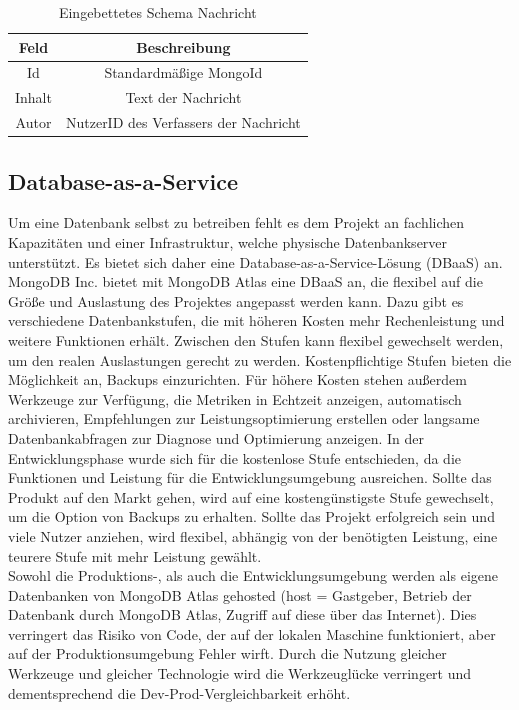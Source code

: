 \begin{table}
    \centering
    \begin{tabular}{ |c|c| }
        \hline
        Feld & Beschreibung  \\
        \hline
        Id & Standardmäßige MongoId \\
        Inhalt & Text der Nachricht \\
        Autor & NutzerID des Verfassers der Nachricht \\
        \hline
    \end{tabular}
    \caption{Eingebettetes Schema Nachricht}
    \label{db:table:nachricht}
\end{table}

\subsection{Database-as-a-Service}
Um eine Datenbank selbst zu betreiben fehlt es dem Projekt an fachlichen Kapazitäten und einer Infrastruktur, welche physische Datenbankserver unterstützt.
Es bietet sich daher eine Database-as-a-Service-Lösung (DBaaS) an.\\ 
MongoDB Inc. bietet mit MongoDB Atlas eine DBaaS an, die flexibel auf die Größe und Auslastung des Projektes angepasst werden kann.
Dazu gibt es verschiedene Datenbankstufen, die mit höheren Kosten mehr Rechenleistung und weitere Funktionen erhält.
Zwischen den Stufen kann flexibel gewechselt werden, um den realen Auslastungen gerecht zu werden.
Kostenpflichtige Stufen bieten die Möglichkeit an, Backups einzurichten.
Für höhere Kosten stehen außerdem Werkzeuge zur Verfügung, die Metriken in Echtzeit anzeigen, automatisch archivieren, Empfehlungen zur Leistungsoptimierung erstellen oder langsame Datenbankabfragen zur Diagnose und Optimierung anzeigen.
In der Entwicklungsphase wurde sich für die kostenlose Stufe entschieden, da die Funktionen und Leistung für die Entwicklungsumgebung ausreichen.
Sollte das Produkt auf den Markt gehen, wird auf eine kostengünstigste Stufe gewechselt, um die Option von Backups zu erhalten.
Sollte das Projekt erfolgreich sein und viele Nutzer anziehen, wird flexibel, abhängig von der benötigten Leistung, eine teurere Stufe mit mehr Leistung gewählt.\\
Sowohl die Produktions-, als auch die Entwicklungsumgebung werden als eigene Datenbanken von MongoDB Atlas gehosted (host = Gastgeber, Betrieb der Datenbank durch MongoDB Atlas, Zugriff auf diese über das Internet).
Dies verringert das Risiko von Code, der auf der lokalen Maschine funktioniert, aber auf der Produktionsumgebung Fehler wirft.
Durch die Nutzung gleicher Werkzeuge und gleicher Technologie wird die Werkzeuglücke verringert und dementsprechend die Dev-Prod-Vergleichbarkeit erhöht. \cite{db:devProdParity}

